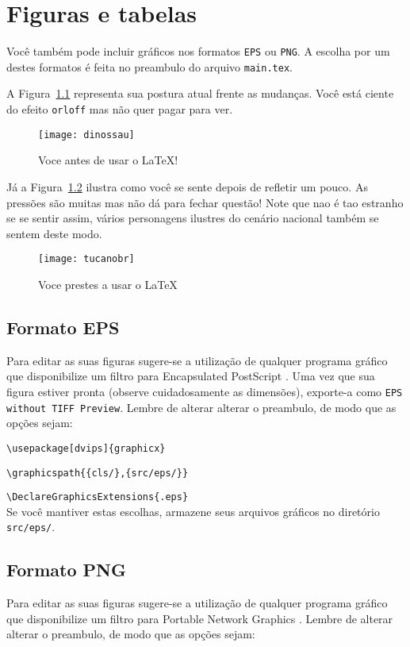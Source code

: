
\chapter{Figuras e tabelas}

Você também pode incluir gráficos nos formatos \texttt{EPS} ou \texttt{PNG}. A escolha por um destes formatos é feita no preambulo do arquivo \texttt{main.tex}. 

A Figura~\ref{dinosaur} representa sua postura atual frente as mudanças.
Você está ciente do efeito \texttt{orloff} mas não quer pagar para
ver. \begin{figure}[htbp]
\centering \texttt{[image: dinossau]} \caption{Voce antes de usar o LaTeX!}%
\label{dinosaur}%
\end{figure}

Já a Figura~\ref{toucan} ilustra como você se sente depois de refletir
um pouco. As pressões são muitas mas não dá para fechar
questão! Note que nao é tao estranho se se sentir assim, vários
personagens ilustres do cenário nacional também se sentem deste modo.
\begin{figure}[htbp]
\centering \texttt{[image: tucanobr]} \caption{Voce prestes a usar o LaTeX}%
\label{toucan}%
\end{figure}

\section{Formato EPS}

Para editar as suas figuras sugere-se a utilização de qualquer
programa gráfico que disponibilize um filtro para Encapsulated PostScript
\cite{Doron92e}. Uma vez que sua figura estiver pronta (observe cuidadosamente as dimensões), exporte-a como \texttt{EPS without TIFF Preview}. Lembre de alterar alterar o preambulo, de modo que as opções sejam:

\noindent\verb|\usepackage[dvips]{graphicx}|

\noindent\verb|\graphicspath{{cls/},{src/eps/}}|

\noindent\verb|\DeclareGraphicsExtensions{.eps}|\\
Se você mantiver estas escolhas, armazene seus arquivos gráficos no diretório \texttt{src/eps/}.

\section{Formato PNG}
Para editar as suas figuras sugere-se a utilização de qualquer
programa gráfico que disponibilize um filtro para Portable Network Graphics
\cite{Christensson}. Lembre de alterar alterar o preambulo, de modo que as opções sejam:

